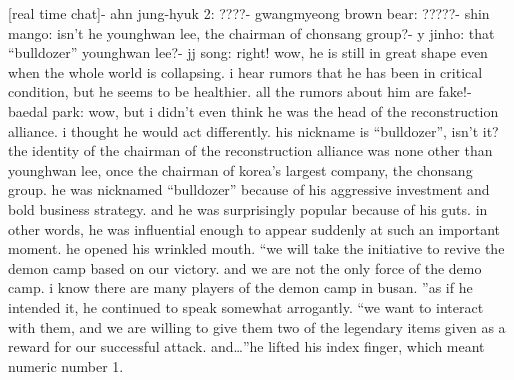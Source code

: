 [real time chat]- ahn jung-hyuk 2: ????- gwangmyeong brown bear: ?????- shin mango: isn’t he younghwan lee, the chairman of chonsang group?- y jinho: that “bulldozer” younghwan lee?- jj song: right! wow, he is still in great shape even when the whole world is collapsing.
 i hear rumors that he has been in critical condition, but he seems to be healthier.
 all the rumors about him are fake!- baedal park: wow, but i didn’t even think he was the head of the reconstruction alliance.
 i thought he would act differently.
 his nickname is “bulldozer”, isn’t it?the identity of the chairman of the reconstruction alliance was none other than younghwan lee, once the chairman of korea’s largest company, the chonsang group.
he was nicknamed “bulldozer” because of his aggressive investment and bold business strategy.
 and he was surprisingly popular because of his guts.
in other words, he was influential enough to appear suddenly at such an important moment.
he opened his wrinkled mouth.
“we will take the initiative to revive the demon camp based on our victory.
 and we are not the only force of the demo camp.
 i know there are many players of the demon camp in busan.
”as if he intended it, he continued to speak somewhat arrogantly.
“we want to interact with them, and we are willing to give them two of the legendary items given as a reward for our successful attack.
 and…”he lifted his index finger, which meant numeric number 1.

